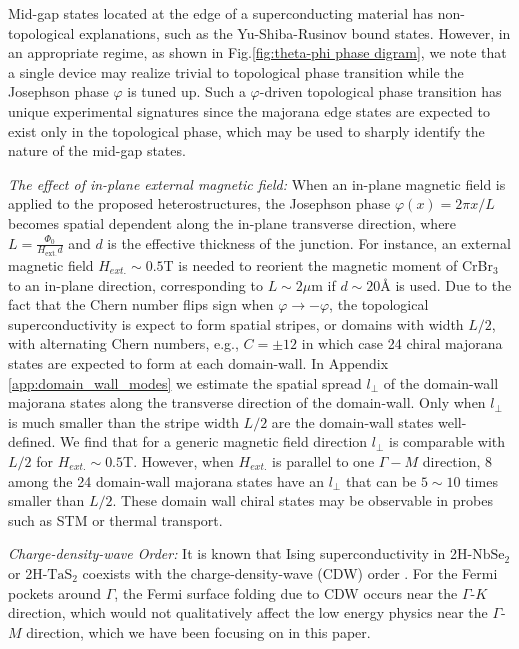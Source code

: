 Mid-gap states located at the edge of a superconducting material has non-topological explanations, such as the Yu-Shiba-Rusinov bound states. However, in an appropriate regime, as shown in Fig.\ref{fig:theta-phi phase digram}, we note that a single device may realize trivial to topological phase transition while the Josephson phase $\varphi$ is tuned up. Such a $\varphi$-driven topological phase transition has unique experimental signatures since the majorana edge states are expected to exist only in the topological phase, which may be used to sharply identify the nature of the mid-gap states.

\vspace{1em}

\emph{The effect of in-plane external magnetic field:} When an in-plane magnetic field is applied to the proposed heterostructures, the Josephson phase $\varphi(x)=2\pi x/L$ becomes spatial dependent along the in-plane transverse direction, where $L=\frac{\Phi_0}{H_{\text{ext.}}d}$ and $d$ is the effective thickness of the junction. For instance, an external magnetic field $H_{ext.}\sim 0.5$T is needed to reorient the magnetic moment of CrBr$_3$ to an in-plane direction, corresponding to $L\sim 2\mu$m if $d\sim 20\text{\AA}$ is used. Due to the fact that the Chern number flips sign when $\varphi\rightarrow -\varphi$, the topological superconductivity is expect to form spatial stripes, or domains with width $L/2$, with alternating Chern numbers, e.g., $C=\pm12$ in which case 24 chiral majorana states are expected to form at each domain-wall. In Appendix \ref{app:domain_wall_modes} we estimate the spatial spread $l_\perp$  of the domain-wall majorana states along the transverse direction of the domain-wall. Only when $l_\perp$ is much smaller than the stripe width $L/2$ are the domain-wall states well-defined. We find that for a generic magnetic field direction $l_\perp$ is comparable with $L/2$ for $H_{ext.}\sim 0.5$T. However, when $H_{ext.}$ is parallel to one $\Gamma-M$ direction, 8 among the 24 domain-wall majorana states have an $l_\perp$ that can be $5\sim 10$ times smaller than $L/2$. These domain wall chiral states may be observable in probes such as STM or thermal transport.



\vspace{1em}
\emph{Charge-density-wave Order:} It is known that Ising superconductivity in 2H-$\mathrm{NbSe_2}$ or 2H-$\mathrm{TaS_2}$ coexists with the charge-density-wave (CDW) order \cite{ugeda2016characterization,xi2015strongly,nakata2018anisotropic}. For the Fermi pockets around $\Gamma$, the Fermi surface folding due to CDW occurs near the $\Gamma$-$K$ direction, which would not qualitatively affect the low energy physics near the $\Gamma$-$M$ direction, which we have been focusing on in this paper.

